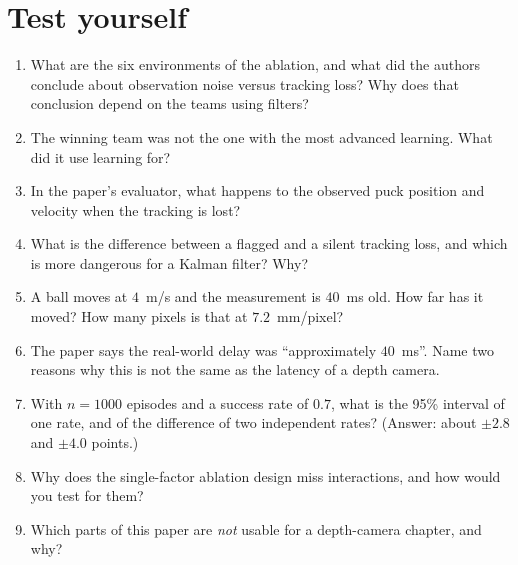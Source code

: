 \documentclass[11pt,a4paper]{article}
\begin{document}
\section{Test yourself}

\begin{enumerate}
\item What are the six environments of the ablation, and what did the authors conclude about
observation noise versus tracking loss? Why does that conclusion depend on the teams using filters?
\item The winning team was not the one with the most advanced learning. What did it use learning
for?
\item In the paper's evaluator, what happens to the observed puck position and velocity when the
tracking is lost?
\item What is the difference between a flagged and a silent tracking loss, and which is more
dangerous for a Kalman filter? Why?
\item A ball moves at $4$~m/s and the measurement is $40$~ms old. How far has it moved? How many
pixels is that at $7.2$~mm/pixel?
\item The paper says the real-world delay was ``approximately $40$~ms''. Name two reasons why this
is not the same as the latency of a depth camera.
\item With $n=1000$ episodes and a success rate of $0.7$, what is the 95\% interval of one rate,
and of the difference of two independent rates? (Answer: about $\pm2.8$ and $\pm4.0$ points.)
\item Why does the single-factor ablation design miss interactions, and how would you test for
them?
\item Which parts of this paper are \emph{not} usable for a depth-camera chapter, and why?
\end{enumerate}

\appendix
\end{document}
